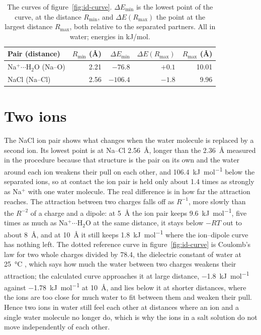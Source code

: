 \begin{table}[htbp]
	\centering
	\caption{The curves of figure~\ref{fig:id-curve}. $\Delta E_\mathrm{min}$ is the lowest point of the curve, at the distance $R_\mathrm{min}$, and $\Delta E(R_\mathrm{max})$ the point at the largest distance $R_\mathrm{max}$, both relative to the separated partners. All in water; energies in kJ/mol.}
	\label{tab:id-curve}
	\begin{tabular}{lrrrr}
		\toprule
		Pair (distance) & $R_\mathrm{min}$ (\AA) & $\Delta E_\mathrm{min}$ & $\Delta E(R_\mathrm{max})$ & $R_\mathrm{max}$ (\AA) \\
		\midrule
		Na$^+\cdots$H$_2$O (Na--O) & 2.21 & $-76.8$ & $+0.1$ & 10.01 \\
		NaCl (Na--Cl) & 2.56 & $-106.4$ & $-1.8$ & 9.96 \\
		\bottomrule
	\end{tabular}
\end{table}

\section{Two ions}
The NaCl ion pair shows what changes when the water molecule is replaced by a second ion. Its lowest point is at Na--Cl \SI{2.56}{\angstrom}, longer than the \SI{2.36}{\angstrom} measured in the procedure because that structure is the pair on its own and the water around each ion weakens their pull on each other, and \SI{106.4}{kJ.mol^{-1}} below the separated ions, so at contact the ion pair is held only about 1.4 times as strongly as Na$^+$ with one water molecule. The real difference is in how far the attraction reaches. The attraction between two charges falls off as $R^{-1}$, more slowly than the $R^{-2}$ of a charge and a dipole: at \SI{5}{\angstrom} the ion pair keeps \SI{9.6}{kJ.mol^{-1}}, five times as much as Na$^+\cdots$H$_2$O at the same distance, it stays below $-RT$ out to about \SI{8}{\angstrom}, and at \SI{10}{\angstrom} it still keeps \SI{1.8}{kJ.mol^{-1}} where the ion--dipole curve has nothing left. The dotted reference curve in figure~\ref{fig:id-curve} is Coulomb's law for two whole charges divided by 78.4, the dielectric constant of water at \SI{25}{\celsius} \cite{fernandez1997}, which says how much the water between two charges weakens their attraction; the calculated curve approaches it at large distance, \SI{-1.8}{kJ.mol^{-1}} against \SI{-1.78}{kJ.mol^{-1}} at \SI{10}{\angstrom}, and lies below it at shorter distances, where the ions are too close for much water to fit between them and weaken their pull. Hence two ions in water still feel each other at distances where an ion and a single water molecule no longer do, which is why the ions in a salt solution do not move independently of each other.

